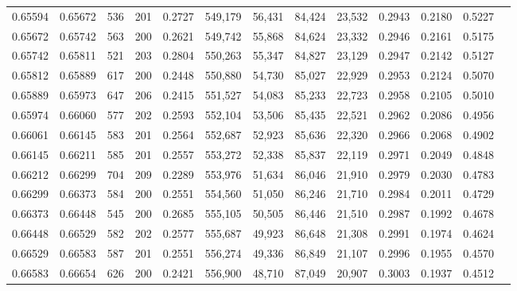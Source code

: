 \begin{tabular}{rrrrrrrrrrrrr}
0.65594 & 0.65672 &   536 & 201 &                                     0.2727 & 549,179 &  56,431 &  84,424 &  23,532 & 0.2943 & 0.2180 & 0.5227 \\
0.65672 & 0.65742 &   563 & 200 &                                     0.2621 & 549,742 &  55,868 &  84,624 &  23,332 & 0.2946 & 0.2161 & 0.5175 \\
0.65742 & 0.65811 &   521 & 203 &                                     0.2804 & 550,263 &  55,347 &  84,827 &  23,129 & 0.2947 & 0.2142 & 0.5127 \\
0.65812 & 0.65889 &   617 & 200 &                                     0.2448 & 550,880 &  54,730 &  85,027 &  22,929 & 0.2953 & 0.2124 & 0.5070 \\
0.65889 & 0.65973 &   647 & 206 &                                     0.2415 & 551,527 &  54,083 &  85,233 &  22,723 & 0.2958 & 0.2105 & 0.5010 \\
0.65974 & 0.66060 &   577 & 202 &                                     0.2593 & 552,104 &  53,506 &  85,435 &  22,521 & 0.2962 & 0.2086 & 0.4956 \\
0.66061 & 0.66145 &   583 & 201 &                                     0.2564 & 552,687 &  52,923 &  85,636 &  22,320 & 0.2966 & 0.2068 & 0.4902 \\
0.66145 & 0.66211 &   585 & 201 &                                     0.2557 & 553,272 &  52,338 &  85,837 &  22,119 & 0.2971 & 0.2049 & 0.4848 \\
0.66212 & 0.66299 &   704 & 209 &                                     0.2289 & 553,976 &  51,634 &  86,046 &  21,910 & 0.2979 & 0.2030 & 0.4783 \\
0.66299 & 0.66373 &   584 & 200 &                                     0.2551 & 554,560 &  51,050 &  86,246 &  21,710 & 0.2984 & 0.2011 & 0.4729 \\
0.66373 & 0.66448 &   545 & 200 &                                     0.2685 & 555,105 &  50,505 &  86,446 &  21,510 & 0.2987 & 0.1992 & 0.4678 \\
0.66448 & 0.66529 &   582 & 202 &                                     0.2577 & 555,687 &  49,923 &  86,648 &  21,308 & 0.2991 & 0.1974 & 0.4624 \\
0.66529 & 0.66583 &   587 & 201 &                                     0.2551 & 556,274 &  49,336 &  86,849 &  21,107 & 0.2996 & 0.1955 & 0.4570 \\
0.66583 & 0.66654 &   626 & 200 &                                     0.2421 & 556,900 &  48,710 &  87,049 &  20,907 & 0.3003 & 0.1937 & 0.4512 \\

\end{tabular}
